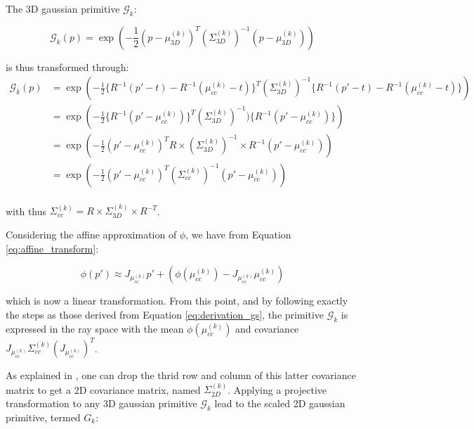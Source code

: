 The 3D gaussian primitive $\mathcal{G}_{k}$: 

\begin{equation}
    \mathcal{G}_{k}(p) = \exp \left(-\frac{1}{2}(p-\mu^{(k)}_{3D})^{T}(\Sigma^{(k)}_{3D})^{-1}(p-\mu^{(k)}_{3D})\right)
  \end{equation}
  
is thus transformed through: 
\begin{equation}
    \label{eq:derivation_gs}
    \begin{aligned}
    \mathcal{G}_{k}(p) &= \exp \left( -\frac{1}{2} \{R^{-1}(p'-t) - R^{-1}(\mu^{(k)}_{cc} -t)\}^{T} (\Sigma^{(k)}_{3D})^{-1}\{R^{-1}(p'-t) - R^{-1}(\mu^{(k)}_{cc} -t)\}  \right) \\
    &= \exp \left( -\frac{1}{2}\{ R^{-1}(p'-\mu^{(k)}_{cc})\}^{T}(\Sigma^{(k)}_{3D})^{-1})\{ R^{-1}(p'-\mu^{(k)}_{cc})\} \right) \\
    &= \exp \left( -\frac{1}{2}(p'-\mu^{(k)}_{cc})^{T}R\times(\Sigma^{(k)}_{3D})^{-1}\times R^{-1}(p'-\mu^{(k)}_{cc})\right) \\
    &= \exp \left( -\frac{1}{2}(p'-\mu^{(k)}_{cc})^{T}(\Sigma^{(k)}_{cc})^{-1}(p'-\mu^{(k)}_{cc})\right) \\
    \end{aligned}
\end{equation}

with thus $\Sigma^{(k)}_{cc} = R\times \Sigma^{(k)}_{3D}\times R^{-T}$. \newline


Considering the affine approximation of $\phi$, we have from Equation \eqref{eq:affine_transform}: 

\begin{equation}
  \phi(p')  \approx J_{\mu_{cc}^{(k)}}p' + (\phi(\mu_{cc}^{(k)}) -  J_{\mu_{cc}^{(k)}}\mu_{cc}^{(k)})
\end{equation}

which is now a linear transformation. From this point, and by following exactly the steps as those derived from Equation \eqref{eq:derivation_gs}, the primitive $\mathcal{G}_{k}$ is expressed in the ray space with the mean $\phi(\mu_{cc}^{(k)})$ and covariance $J_{\mu_{cc}^{(k)}}\Sigma^{(k)}_{cc}(J_{\mu_{cc}^{(k)}})^{T}$. 

As explained in \citep{zwicker2001ewa}, one can drop the thrid row and column of this latter covariance matrix to get a 2D covariance matrix, named $\Sigma^{(k)}_{2D}$. Applying a projective transformation to any 3D gaussian primitive $\mathcal{G}_{k}$ lead to the scaled 2D gaussian primitive, termed $G_{k}$: 

